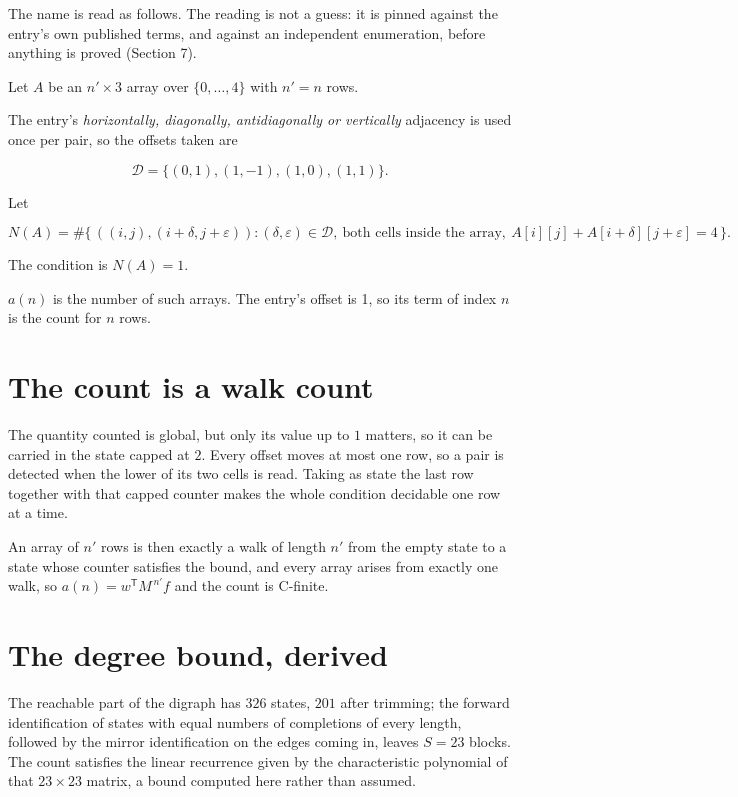 \documentclass[11pt]{article}
\theoremstyle{definition}
\begin{document}
The name is read as follows. The reading is not a guess: it is pinned against the entry's own published terms, and against an independent enumeration, before anything is proved (Section 7).

Let $A$ be an $n' \times 3$ array over $\{0,\dots,4\}$ with $n' = n$ rows.

The entry's {\itshape horizontally, diagonally, antidiagonally or vertically} adjacency is used once per pair, so the offsets taken are

\[\mathcal{D} = \{(0,1), (1,-1), (1,0), (1,1)\}.\]

Let

\[N(A) = \#\bigl\{\,((i,j),(i{+}\delta,j{+}\varepsilon)) : (\delta,\varepsilon) \in \mathcal{D},\ \text{both cells inside the array},\ A[i][j] + A[i{+}\delta][j{+}\varepsilon] = 4\,\bigr\}.\]

The condition is $N(A) = 1$.

$a(n)$ is the number of such arrays. The entry's offset is 1, so its term of index $n$ is the count for $n$ rows.

\section{The count is a walk count}

The quantity counted is global, but only its value up to $1$ matters, so it can be carried in the state capped at $2$. Every offset moves at most one row, so a pair is detected when the lower of its two cells is read. Taking as state the last row together with that capped counter makes the whole condition decidable one row at a time.

An array of $n'$ rows is then exactly a walk of length $n'$ from the empty state to a state whose counter satisfies the bound, and every array arises from exactly one walk, so $a(n) = w^{\mathsf T}M^{\,n'}f$ and the count is C-finite.

\section{The degree bound, derived}

The reachable part of the digraph has $326$ states, $201$ after trimming; the forward identification of states with equal numbers of completions of every length, followed by the mirror identification on the edges coming in, leaves $S = 23$ blocks. The count satisfies the linear recurrence given by the characteristic polynomial of that $23\times23$ matrix, a bound computed here rather than assumed.
\end{document}
